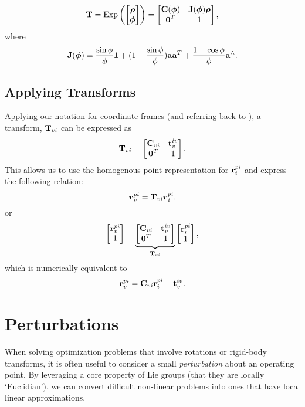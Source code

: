 \begin{equation}
\boldsymbol{\mathbf{T}} = \mathrm{Exp}\left({\begin{bmatrix} \boldsymbol{\mathbf{\rho}} \\ \boldsymbol{\mathbf{\phi}} \end{bmatrix}}\right) = \begin{bmatrix} \boldsymbol{\mathbf{C}}(\boldsymbol{\mathbf{\phi}}) & \boldsymbol{\mathbf{J}}(\boldsymbol{\mathbf{\phi}}) \boldsymbol{\mathbf{\rho}} \\ \boldsymbol{\mathbf{0}}^T & 1 \end{bmatrix},
\end{equation}
where
\begin{equation}
\boldsymbol{\mathbf{J}}(\boldsymbol{\mathbf{\phi}}) = \frac{\sin{\phi}}{\phi} \boldsymbol{\mathbf{1}} + (1 - \frac{\sin{\phi}}{\phi}) \boldsymbol{\mathbf{a}}\boldsymbol{\mathbf{a}}^T + \frac{1 - \cos{\phi}}{\phi} \boldsymbol{\mathbf{a}}^\wedge.
\end{equation}




\subsection{Applying Transforms}
Applying our notation for coordinate frames (and referring back to ), a transform, $\boldsymbol{\mathbf{T}}_{vi}$ can be expressed as 
\begin{equation}
\boldsymbol{\mathbf{T}}_{vi} = \begin{bmatrix} \boldsymbol{\mathbf{C}}_{vi} & \boldsymbol{\mathbf{t}}_v^{iv} \\ \boldsymbol{\mathbf{0}}^T & 1 \end{bmatrix}.
\end{equation}
This allows us to use the homogenous point representation for $\boldsymbol{\mathbf{r}}^{pi}_i$ and express the following relation:
\begin{equation}
	\boldsymbol{r}^{pi}_v = \boldsymbol{\mathbf{T}}_{vi} \boldsymbol{r}^{pi}_i,
\end{equation}
or
\begin{equation}
	\begin{bmatrix} \boldsymbol{\mathbf{r}}^{pi}_v \\ 1 \end{bmatrix} = \underbrace{\begin{bmatrix} \boldsymbol{\mathbf{C}}_{vi} & \boldsymbol{\mathbf{t}}_v^{iv} \\ \boldsymbol{\mathbf{0}}^T & 1 \end{bmatrix}}_{\boldsymbol{\mathbf{T}}_{vi}} \begin{bmatrix} \boldsymbol{\mathbf{r}}^{pi}_i \\ 1 \end{bmatrix},
\end{equation}
which is numerically equivalent to  
\begin{equation}
 \boldsymbol{\mathbf{r}}^{pi}_v =  \boldsymbol{\mathbf{C}}_{vi} \boldsymbol{\mathbf{r}}^{pi}_i + \boldsymbol{\mathbf{t}}_v^{iv}.  
 \end{equation}

\section{Perturbations}

When solving optimization problems that involve rotations or rigid-body transforms, it is often useful to consider a small \textit{perturbation} about an operating point. By leveraging a core property of Lie groups (that they are locally `Euclidian'), we can convert difficult non-linear problems into ones that have local linear approximations.

